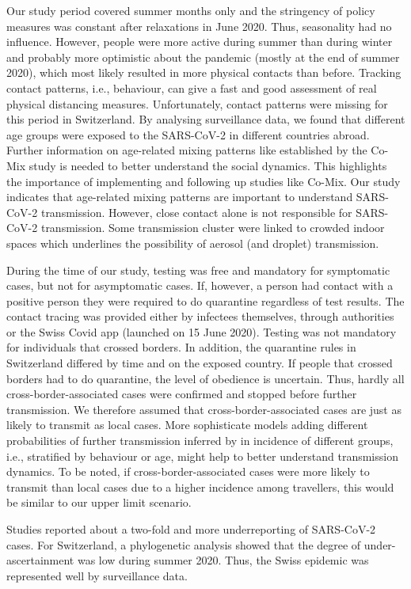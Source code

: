 \documentclass[10pt, a4paper, twoside]{article}
\begin{document}
\begin{multicols}{2}
Our study period covered summer months only and the stringency of policy measures was constant after relaxations in June 2020.
Thus, seasonality had no influence.
However, people were more active during summer than during winter and probably more optimistic about the pandemic (mostly at the end of summer 2020), which most likely resulted in more physical contacts than before.
Tracking contact patterns, i.e., behaviour, can give a fast and good assessment of real physical distancing measures.\cite{jarvis_quantifying_2020}
Unfortunately, contact patterns were missing for this period in Switzerland.
By analysing surveillance data, we found that different age groups were exposed to the SARS-CoV-2 in different countries abroad.
Further information on age-related mixing patterns like established by the Co-Mix study is needed to better understand the social dynamics.\cite{coletti_comix_2020}
This highlights the importance of implementing and following up studies like Co-Mix.
Our study indicates that age-related mixing patterns are important to understand SARS-CoV-2 transmission.
However, close contact alone is not responsible for SARS-CoV-2 transmission.
Some transmission cluster were linked to crowded indoor spaces which underlines the possibility of aerosol (and droplet) transmission.\cite{tang_aerosol_2020}

During the time of our study, testing was free and mandatory for symptomatic cases, but not for asymptomatic cases.
If, however, a person had contact with a positive person they were required to do quarantine regardless of test results.
The contact tracing was provided either by infectees themselves, through authorities or the Swiss Covid app (launched on 15 June 2020).\cite{salath_early_2020}
Testing was not mandatory for individuals that crossed borders.
In addition, the quarantine rules in Switzerland differed by time and on the exposed country.
If people that crossed borders had to do quarantine, the level of obedience is uncertain.
Thus, hardly all cross-border-associated cases were confirmed and stopped before further transmission.
We therefore assumed that cross-border-associated cases are just as likely to transmit as local cases.
More sophisticate models adding different probabilities of further transmission inferred by in incidence of different groups, i.e., stratified by behaviour or age, might help to better understand transmission dynamics.
To be noted, if cross-border-associated cases were more likely to transmit than local cases due to a higher incidence among travellers, this would be similar to our upper limit scenario.
\break
\par
Studies reported about a two-fold and more underreporting of SARS-CoV-2 cases.\cite{Li_substantial_2020,Wu_substantial_2020}
For Switzerland, a phylogenetic analysis showed that the degree of under-ascertainment was low during summer 2020.\cite{nadeau_quantifying_2020}
Thus, the Swiss epidemic was represented well by surveillance data.


\end{multicols}
\end{document}
